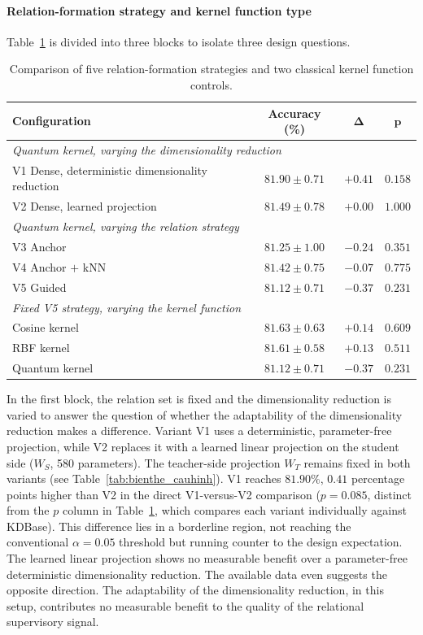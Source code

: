 \paragraph{Relation-formation strategy and kernel function type}

Table~\ref{tab:bienthe} is divided into three blocks to isolate
three design questions.

\begin{table}[!htbp]
\centering
\caption{Comparison of five relation-formation strategies and two
classical kernel function controls.}
\label{tab:bienthe}
\begin{tabular}{lccc}
\toprule
\textbf{Configuration} & \textbf{Accuracy (\%)} & $\boldsymbol{\Delta}$ & $\boldsymbol{p}$ \\
\midrule
\multicolumn{4}{l}{\textit{Quantum kernel, varying the dimensionality reduction}} \\
V1 Dense, deterministic dimensionality reduction & $81.90 \pm 0.71$ & $+0.41$ & $0.158$ \\
V2 Dense, learned projection & $81.49 \pm 0.78$ & $+0.00$ & $1.000$ \\
\midrule
\multicolumn{4}{l}{\textit{Quantum kernel, varying the relation strategy}} \\
V3 Anchor & $81.25 \pm 1.00$ & $-0.24$ & $0.351$ \\
V4 Anchor $+$ kNN & $81.42 \pm 0.75$ & $-0.07$ & $0.775$ \\
V5 Guided & $81.12 \pm 0.71$ & $-0.37$ & $0.231$ \\
\midrule
\multicolumn{4}{l}{\textit{Fixed V5 strategy, varying the kernel function}} \\
Cosine kernel & $81.63 \pm 0.63$ & $+0.14$ & $0.609$ \\
RBF kernel & $81.61 \pm 0.58$ & $+0.13$ & $0.511$ \\
Quantum kernel & $81.12 \pm 0.71$ & $-0.37$ & $0.231$ \\
\bottomrule
\end{tabular}
\end{table}
\FloatBarrier

In the first block, the relation set is fixed and the
dimensionality reduction is varied to answer the question of
whether the adaptability of the dimensionality reduction makes a
difference. Variant V1 uses a deterministic, parameter-free
projection, while V2 replaces it with a learned linear projection on
the student side ($W_S$, 580 parameters). The teacher-side projection
$W_T$ remains fixed in both variants (see
Table~\ref{tab:bienthe_cauhinh}). V1 reaches $81.90\%$, $0.41$
percentage points higher than V2 in the direct V1-versus-V2
comparison ($p = 0.085$, distinct from the $p$ column in
Table~\ref{tab:bienthe}, which compares each variant individually
against KDBase). This difference lies in a borderline region, not
reaching the conventional $\alpha = 0.05$ threshold but running
counter to the design expectation. The learned linear projection
shows no measurable benefit over a parameter-free deterministic
dimensionality reduction. The available data even suggests the
opposite direction. The adaptability of the dimensionality
reduction, in this setup, contributes no measurable benefit to the
quality of the relational supervisory signal.

